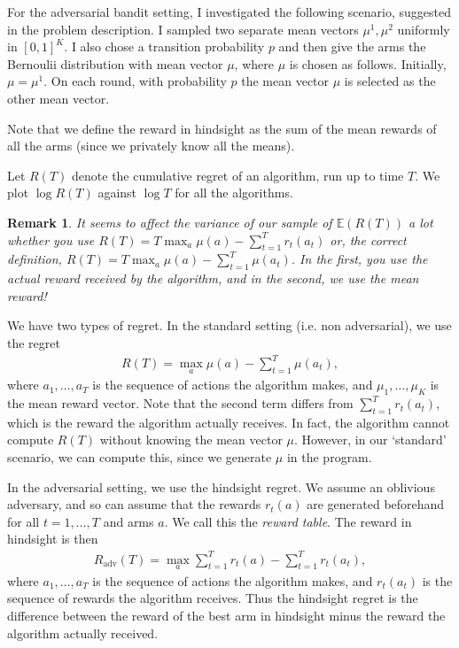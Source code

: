 \documentclass[10pt]{article}
\newtheorem{remark}{Remark}
\newcommand{\EE}{\mathbb{E}}
\DeclareMathOperator{\adv}{adv}
\begin{document}
For the adversarial bandit setting, I investigated the following scenario,
suggested in the problem description. I sampled two separate mean vectors
$\mu^1, \mu^2$ uniformly in $[0,1]^K$. I also chose a transition probability $p$
and then give the arms the Bernoulii distribution with mean vector $\mu$, where
$\mu$ is chosen as follows.  Initially, $\mu = \mu^1$. On each round, with
probability $p$ the mean vector $\mu$ is selected as the other mean vector.



Note that we define the reward in hindsight as the sum of the mean rewards of
all the arms (since we privately know all the means).



Let $R(T)$ denote the cumulative regret of an algorithm, run up to time $T$. We
plot $\log R(T)$ against $\log T$ for all the algorithms.


\begin{remark}
    It seems to affect the variance of our sample of $\EE(R(T))$ a lot whether
    you use $R(T) = T \max_a \mu(a) - \sum_{t=1}^T r_t(a_t)$ or, the correct
    definition, $R(T) = T \max_a \mu(a) - \sum_{t=1}^T \mu(a_t)$. In the first,
    you use the actual reward received by the algorithm, and in the second, we
    use the mean reward!
\end{remark}



We have two types of regret. In the standard setting (i.e. non adversarial), we
use the regret
\begin{align*}
    R(T) = \max_a \mu(a) - \sum_{t=1}^T \mu(a_t),
\end{align*}
where $a_1, \ldots, a_T$ is the sequence of actions the algorithm makes, and
$\mu_1, \ldots, \mu_K$ is the mean reward vector. Note that the second term
differs from $\sum_{t=1}^T r_t(a_t)$, which is the reward the algorithm
actually receives. In fact, the algorithm cannot compute $R(T)$ without knowing
the mean vector $\mu$. However, in our `standard' scenario, we can compute this,
since we generate $\mu$ in the program.

In the adversarial setting, we use the hindsight regret. We assume an oblivious
adversary, and so can assume that the rewards $r_t(a)$ are generated beforehand
for all $t = 1, \ldots, T$ and arms $a$. We call this the \emph{reward table}.
The reward in hindsight is then
\begin{align*}
    R_{\adv}(T) = \max_a \sum_{t=1}^T r_t(a) - \sum_{t=1}^T r_t(a_t),
\end{align*}
where $a_1, \ldots, a_T$ is the sequence of actions the algorithm makes, and
$r_t(a_t)$ is the sequence of rewards the algorithm receives. Thus the hindsight
regret is the difference between the reward of the best arm in hindsight minus
the reward the algorithm actually received.
\end{document}
